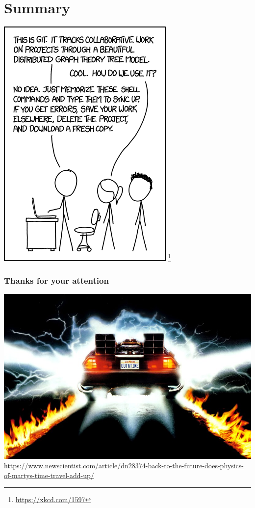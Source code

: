 \documentclass[
t, %
10pt, %
aspectratio=1610, %
ngerman,
english,
]{beamer}
\newcommand\blfootnote[1]{%
  \begingroup
  \renewcommand\thefootnote{}\footnote{#1}%
  \addtocounter{footnote}{-1}%
  \endgroup
}
\begin{document}
\section{Summary}

\begin{frame}
    \includegraphics[height=0.7\textheight]{graphics/xkcd-git.png}
    \blfootnote{\url{https://xkcd.com/1597}}
\end{frame}


\begin{frame}
    \frametitle{Thanks for your attention}
    \centering
    \includegraphics[height=0.7\textheight]{graphics/dn28374-1_800.jpg}\\
    \url{https://www.newscientist.com/article/dn28374-back-to-the-future-does-physics-of-martys-time-travel-add-up/}
\end{frame}
\end{document}
